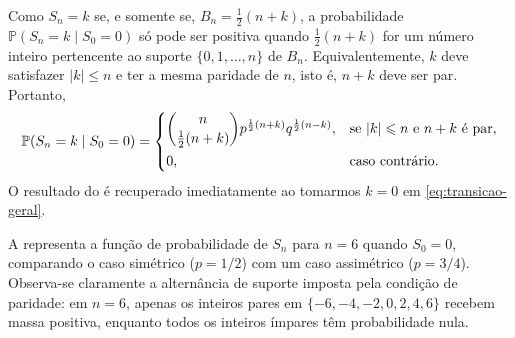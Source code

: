 \documentclass[12pt,portuguese]{article}
\theoremstyle{definition}
\theoremstyle{plainexercise}
\theoremstyle{starredexercise}
\theoremstyle{definition}
\begin{document}
Como $S_n = k$ se, e somente se, $B_n = \tfrac{1}{2}(n + k)$, a
probabilidade $\mathbb{P}(S_n = k \mid S_0 = 0)$ só pode ser positiva quando
$\tfrac{1}{2}(n + k)$ for um número inteiro pertencente ao suporte
$\{0, 1, \ldots, n\}$ de $B_n$. Equivalentemente, $k$ deve satisfazer
$|k| \leqslant n$ e ter a mesma paridade de $n$, isto é, $n + k$ deve ser
par. Portanto,
\begin{equation}\label{eq:transicao-geral}
  \mathbb{P}(S_n = k \mid S_0 = 0) =
  \begin{cases}
    \dbinom{n}{\frac{1}{2}(n + k)} p^{\frac{1}{2}(n + k)} q^{\frac{1}{2}(n - k)},
      & \text{se } |k| \leqslant n \text{ e } n + k \text{ é par}, \\[0.3cm]
    0, & \text{caso contrário}.
  \end{cases}
\end{equation}
O resultado do  é recuperado imediatamente ao
tomarmos $k = 0$ em \eqref{eq:transicao-geral}.

A  representa a função de probabilidade de
$S_n$ para $n = 6$ quando $S_0 = 0$, comparando o caso simétrico ($p = 1/2$)
com um caso assimétrico ($p = 3/4$). Observa-se claramente a alternância de
suporte imposta pela condição de paridade: em $n = 6$, apenas os inteiros
pares em $\{-6, -4, -2, 0, 2, 4, 6\}$ recebem massa positiva, enquanto todos
os inteiros ímpares têm probabilidade nula.
\end{document}
